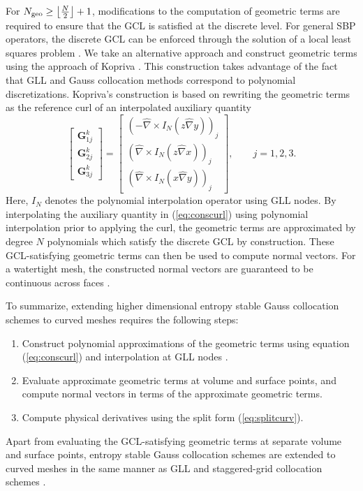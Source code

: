 \documentclass[review,onefignum,onetabnum,final]{siamart171218}
\renewcommand{\hat}{\widehat}
\newcommand{\LRp}[1]{\left( #1 \right)}
\newcommand{\Grad} {\ensuremath{\nabla}}
\begin{document}
For $N_{\rm geo} \geq \left\lfloor\frac{N}{2}\right\rfloor + 1$, modifications to the computation of geometric terms are required to ensure that the GCL is satisfied at the discrete level.  For general SBP operators, the discrete GCL can be enforced through the solution of a local least squares problem \cite{crean2018entropy}.  We take an alternative approach and  construct geometric terms using the approach of Kopriva \cite{kopriva2006metric}.  This construction takes advantage of the fact that GLL and Gauss collocation methods correspond to polynomial discretizations.  Kopriva's construction is based on rewriting the geometric terms as the reference curl of an interpolated auxiliary quantity
\begin{equation}
\label{eq:conscurl}
\begin{bmatrix}
\bm{G}^k_{1j}\\
\bm{G}^k_{2j}\\
\bm{G}^k_{3j}
\end{bmatrix} = \begin{bmatrix}
\LRp{-\hat{\Grad} \times I_N\LRp{z\hat{\Grad}y}}_j\\
\LRp{\hat{\Grad} \times I_N\LRp{z\hat{\Grad}x}}_j\\
\LRp{\hat{\Grad} \times I_N\LRp{x\hat{\Grad}y}}_j
\end{bmatrix}, \qquad j = 1,2,3.
\end{equation}
Here, $I_N$ denotes the polynomial interpolation operator using GLL nodes.  By interpolating the auxiliary quantity in (\ref{eq:conscurl}) using polynomial interpolation prior to applying the curl, the geometric terms are approximated by degree $N$ polynomials which satisfy the discrete GCL by construction.  These GCL-satisfying geometric terms can then be used to compute normal vectors.  For a watertight mesh, the constructed normal vectors are guaranteed to be continuous across faces \cite{chan2018discretely}.  %

To summarize, extending higher dimensional entropy stable Gauss collocation schemes to curved meshes requires the following steps: 
\begin{enumerate}
\item Construct polynomial approximations of the geometric terms using equation (\ref{eq:conscurl}) and interpolation at GLL nodes \cite{kopriva2006metric}.  
\item Evaluate approximate geometric terms at volume and surface points, and compute normal vectors in terms of the approximate geometric terms.  
\item Compute physical derivatives using the split form (\ref{eq:splitcurv}).  
\end{enumerate}
Apart from evaluating the GCL-satisfying geometric terms at separate volume and surface points, entropy stable Gauss collocation schemes are extended to curved meshes in the same manner as GLL and staggered-grid collocation schemes \cite{carpenter2014entropy, parsani2016entropy, chan2018discretely}.  
\end{document}
